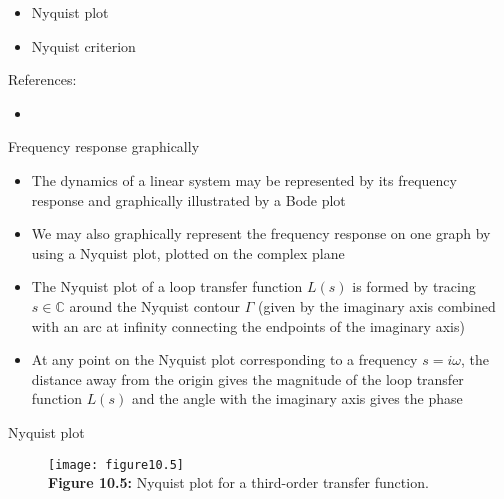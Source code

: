 \documentclass{beamer-control}
\begin{document}

\begin{SUMMARY}
\begin{itemize}
\item Nyquist plot
\item Nyquist criterion
\end{itemize}
\vfill References:
\begin{itemize}
\item {}
\end{itemize}
\end{SUMMARY}




\begin{frame}{Frequency response graphically}
\begin{itemize}
\item The dynamics of a linear system may be represented by its frequency response and graphically illustrated by a Bode plot
\item We may also graphically represent the frequency response on one graph by using a Nyquist plot, plotted on the complex plane
\item The Nyquist plot of a loop transfer function $L(s)$ is formed by tracing $s\in\mathbb{C}$ around the Nyquist contour $\Gamma$ (given by the imaginary axis combined with an arc at infinity connecting the endpoints of the imaginary axis)
\item At any point on the Nyquist plot corresponding to a frequency $s=i\omega$, the distance away from the origin gives the magnitude of the loop transfer function $L(s)$ and the angle with the imaginary axis gives the phase
\end{itemize}
\end{frame}


\begin{frame}{Nyquist plot}
\begin{figure}
	\centering
	\texttt{[image: figure10.5]}
	\\
	\textbf{Figure 10.5:} Nyquist plot for a third-order transfer function.
\end{figure}
\end{frame}


\end{document}
